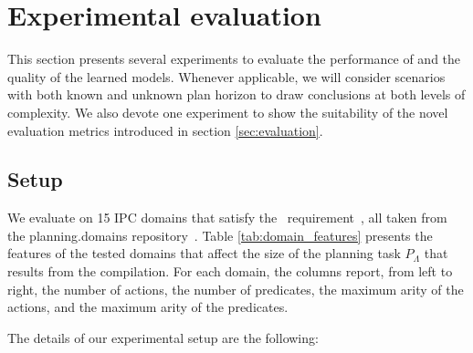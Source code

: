 
\section{Experimental evaluation}
\label{sec:experiments}

This section presents several experiments to evaluate the performance of \FAMA and the quality of the learned models. Whenever applicable, we will consider scenarios with both known and unknown plan horizon to draw conclusions at both levels of complexity. We also devote one experiment to show the suitability of the novel evaluation metrics introduced in section \ref{sec:evaluation}.


\subsection{Setup}

We evaluate \FAMA on 15 IPC domains that satisfy the \strips\ requirement~\cite{fox2003pddl2}, all taken from the {\sc planning.domains} repository~\cite{muise2016planning}. Table \ref{tab:domain_features} presents the features of the tested domains that affect the size of the planning task $P_\Lambda$ that results from the compilation. For each domain, the columns report, from left to right, the number of actions, the number of predicates, the maximum arity of the actions, and the maximum arity of the predicates.

The details of our experimental setup are the following:

